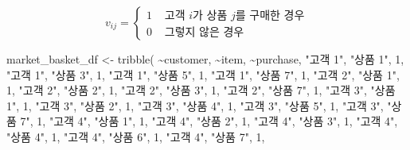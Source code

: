 \documentclass[
]{book}
\newenvironment{Shaded}{\begin{snugshade}}{\end{snugshade}}
\newcommand{\DecValTok}[1]{\textcolor[rgb]{0.00,0.00,0.81}{#1}}
\newcommand{\FunctionTok}[1]{\textcolor[rgb]{0.00,0.00,0.00}{#1}}
\newcommand{\NormalTok}[1]{#1}
\newcommand{\OtherTok}[1]{\textcolor[rgb]{0.56,0.35,0.01}{#1}}
\newcommand{\SpecialCharTok}[1]{\textcolor[rgb]{0.00,0.00,0.00}{#1}}
\newcommand{\StringTok}[1]{\textcolor[rgb]{0.31,0.60,0.02}{#1}}
\begin{document}
\begin{equation*}
v_{ij} = \begin{cases}
1 & \text{ 고객 $i$가 상품 $j$를 구매한 경우}\\
0 & \text{ 그렇지 않은 경우}
\end{cases}
\end{equation*}

\begin{Shaded}
\begin{Highlighting}[]
\NormalTok{market\_basket\_df }\OtherTok{\textless{}{-}} \FunctionTok{tribble}\NormalTok{(}
  \SpecialCharTok{\textasciitilde{}}\NormalTok{customer, }\SpecialCharTok{\textasciitilde{}}\NormalTok{item, }\SpecialCharTok{\textasciitilde{}}\NormalTok{purchase,}
  \StringTok{"고객 1"}\NormalTok{, }\StringTok{"상품 1"}\NormalTok{, }\DecValTok{1}\NormalTok{,}
  \StringTok{"고객 1"}\NormalTok{, }\StringTok{"상품 3"}\NormalTok{, }\DecValTok{1}\NormalTok{,}
  \StringTok{"고객 1"}\NormalTok{, }\StringTok{"상품 5"}\NormalTok{, }\DecValTok{1}\NormalTok{,}
  \StringTok{"고객 1"}\NormalTok{, }\StringTok{"상품 7"}\NormalTok{, }\DecValTok{1}\NormalTok{,}
  \StringTok{"고객 2"}\NormalTok{, }\StringTok{"상품 1"}\NormalTok{, }\DecValTok{1}\NormalTok{,}
  \StringTok{"고객 2"}\NormalTok{, }\StringTok{"상품 2"}\NormalTok{, }\DecValTok{1}\NormalTok{,}
  \StringTok{"고객 2"}\NormalTok{, }\StringTok{"상품 3"}\NormalTok{, }\DecValTok{1}\NormalTok{,}
  \StringTok{"고객 2"}\NormalTok{, }\StringTok{"상품 7"}\NormalTok{, }\DecValTok{1}\NormalTok{,}
  \StringTok{"고객 3"}\NormalTok{, }\StringTok{"상품 1"}\NormalTok{, }\DecValTok{1}\NormalTok{,}
  \StringTok{"고객 3"}\NormalTok{, }\StringTok{"상품 2"}\NormalTok{, }\DecValTok{1}\NormalTok{,}
  \StringTok{"고객 3"}\NormalTok{, }\StringTok{"상품 4"}\NormalTok{, }\DecValTok{1}\NormalTok{,}
  \StringTok{"고객 3"}\NormalTok{, }\StringTok{"상품 5"}\NormalTok{, }\DecValTok{1}\NormalTok{,}
  \StringTok{"고객 3"}\NormalTok{, }\StringTok{"상품 7"}\NormalTok{, }\DecValTok{1}\NormalTok{,}
  \StringTok{"고객 4"}\NormalTok{, }\StringTok{"상품 1"}\NormalTok{, }\DecValTok{1}\NormalTok{,}
  \StringTok{"고객 4"}\NormalTok{, }\StringTok{"상품 2"}\NormalTok{, }\DecValTok{1}\NormalTok{,}
  \StringTok{"고객 4"}\NormalTok{, }\StringTok{"상품 3"}\NormalTok{, }\DecValTok{1}\NormalTok{,}
  \StringTok{"고객 4"}\NormalTok{, }\StringTok{"상품 4"}\NormalTok{, }\DecValTok{1}\NormalTok{,}
  \StringTok{"고객 4"}\NormalTok{, }\StringTok{"상품 6"}\NormalTok{, }\DecValTok{1}\NormalTok{,}
  \StringTok{"고객 4"}\NormalTok{, }\StringTok{"상품 7"}\NormalTok{, }\DecValTok{1}\NormalTok{,}

\end{Highlighting}
\end{Shaded}
\end{document}

